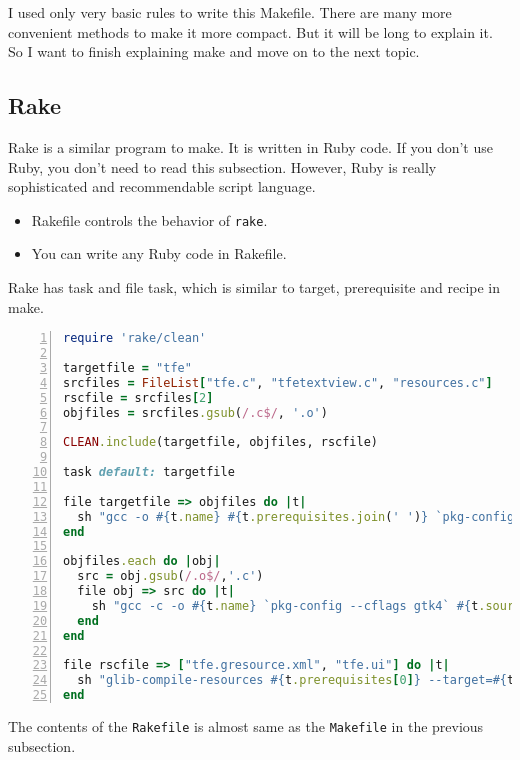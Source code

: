 I used only very basic rules to write this Makefile. There are many more
convenient methods to make it more compact. But it will be long to
explain it. So I want to finish explaining make and move on to the next
topic.

\hypertarget{rake}{%
\subsection{Rake}\label{rake}}

Rake is a similar program to make. It is written in Ruby code. If you
don't use Ruby, you don't need to read this subsection. However, Ruby is
really sophisticated and recommendable script language.

\begin{itemize}
\tightlist
\item
  Rakefile controls the behavior of \passthrough{\lstinline!rake!}.
\item
  You can write any Ruby code in Rakefile.
\end{itemize}

Rake has task and file task, which is similar to target, prerequisite
and recipe in make.

\begin{lstlisting}[language=Ruby, numbers=left]
require 'rake/clean'

targetfile = "tfe"
srcfiles = FileList["tfe.c", "tfetextview.c", "resources.c"]
rscfile = srcfiles[2]
objfiles = srcfiles.gsub(/.c$/, '.o')

CLEAN.include(targetfile, objfiles, rscfile)

task default: targetfile

file targetfile => objfiles do |t|
  sh "gcc -o #{t.name} #{t.prerequisites.join(' ')} `pkg-config --libs gtk4`"
end

objfiles.each do |obj|
  src = obj.gsub(/.o$/,'.c')
  file obj => src do |t|
    sh "gcc -c -o #{t.name} `pkg-config --cflags gtk4` #{t.source}"
  end
end

file rscfile => ["tfe.gresource.xml", "tfe.ui"] do |t|
  sh "glib-compile-resources #{t.prerequisites[0]} --target=#{t.name} --generate-source"
end
\end{lstlisting}

The contents of the \passthrough{\lstinline!Rakefile!} is almost same as
the \passthrough{\lstinline!Makefile!} in the previous subsection.

